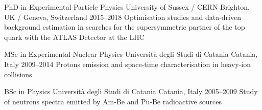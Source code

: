 





\newpage{}

\begin{cventries}

  \cventry
      {PhD in Experimental Particle Physics}
      {University of Sussex / CERN}
      {Brighton, UK / Geneva, Switzerland}
      {2015--2018}
      {Optimisation studies and data-driven background estimation in searches for the 
      supersymmetric partner of the top quark with the ATLAS Detector at the LHC}

  \cventry
      {MSc in Experimental Nuclear Physics}
      {Università degli Studi di Catania}
      {Catania, Italy}
      {2009--2014}
      {Protons emission and space-time characterisation in heavy-ion collisions}
      
  \cventry
      {BSc in Physics}
      {Università degli Studi di Catania}
      {Catania, Italy}
      {2005--2009}
      {Study of neutrons spectra emitted by Am-Be and Pu-Be radioactive sources}
\end{cventries}


